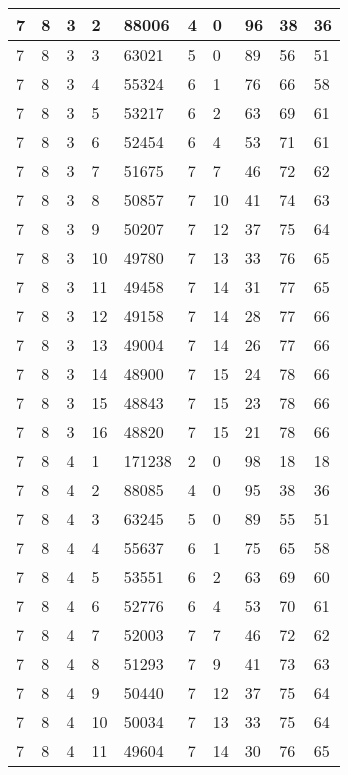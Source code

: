 \begin{table}[!ht]
\begin{tabular}{|l|l|l|l|l|l|l|l|l|l|}
        7 & 8 & 3 & 2 & 88006 & 4 & 0 & 96 & 38 & 36 \\ \hline
        7 & 8 & 3 & 3 & 63021 & 5 & 0 & 89 & 56 & 51 \\ \hline
        7 & 8 & 3 & 4 & 55324 & 6 & 1 & 76 & 66 & 58 \\ \hline
        7 & 8 & 3 & 5 & 53217 & 6 & 2 & 63 & 69 & 61 \\ \hline
        7 & 8 & 3 & 6 & 52454 & 6 & 4 & 53 & 71 & 61 \\ \hline
        7 & 8 & 3 & 7 & 51675 & 7 & 7 & 46 & 72 & 62 \\ \hline
        7 & 8 & 3 & 8 & 50857 & 7 & 10 & 41 & 74 & 63 \\ \hline
        7 & 8 & 3 & 9 & 50207 & 7 & 12 & 37 & 75 & 64 \\ \hline
        7 & 8 & 3 & 10 & 49780 & 7 & 13 & 33 & 76 & 65 \\ \hline
        7 & 8 & 3 & 11 & 49458 & 7 & 14 & 31 & 77 & 65 \\ \hline
        7 & 8 & 3 & 12 & 49158 & 7 & 14 & 28 & 77 & 66 \\ \hline
        7 & 8 & 3 & 13 & 49004 & 7 & 14 & 26 & 77 & 66 \\ \hline
        7 & 8 & 3 & 14 & 48900 & 7 & 15 & 24 & 78 & 66 \\ \hline
        7 & 8 & 3 & 15 & 48843 & 7 & 15 & 23 & 78 & 66 \\ \hline
        7 & 8 & 3 & 16 & 48820 & 7 & 15 & 21 & 78 & 66 \\ \hline
        7 & 8 & 4 & 1 & 171238 & 2 & 0 & 98 & 18 & 18 \\ \hline
        7 & 8 & 4 & 2 & 88085 & 4 & 0 & 95 & 38 & 36 \\ \hline
        7 & 8 & 4 & 3 & 63245 & 5 & 0 & 89 & 55 & 51 \\ \hline
        7 & 8 & 4 & 4 & 55637 & 6 & 1 & 75 & 65 & 58 \\ \hline
        7 & 8 & 4 & 5 & 53551 & 6 & 2 & 63 & 69 & 60 \\ \hline
        7 & 8 & 4 & 6 & 52776 & 6 & 4 & 53 & 70 & 61 \\ \hline
        7 & 8 & 4 & 7 & 52003 & 7 & 7 & 46 & 72 & 62 \\ \hline
        7 & 8 & 4 & 8 & 51293 & 7 & 9 & 41 & 73 & 63 \\ \hline
        7 & 8 & 4 & 9 & 50440 & 7 & 12 & 37 & 75 & 64 \\ \hline
        7 & 8 & 4 & 10 & 50034 & 7 & 13 & 33 & 75 & 64 \\ \hline
        7 & 8 & 4 & 11 & 49604 & 7 & 14 & 30 & 76 & 65 \\ \hline

\end{tabular}
\end{table}
